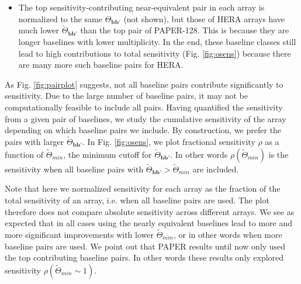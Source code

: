 \documentclass[twocolumn,apj,numberedappendix]{emulateapj}
\renewcommand\[{\begin{equation}}
\renewcommand\]{\end{equation}}
\begin{document}
\begin{itemize}
\item The top sensitivity-contributing near-equivalent pair in each array is normalized to the same $\Theta_{\boldsymbol{bb'}}$ (not shown), but those of HERA arrays have much lower $\widetilde{\Theta}_{\boldsymbol{bb'}}$ than the top pair of PAPER-128. This is because they are longer baselines with lower multiplicity. In the end, these baseline classes still lead to high contributions to total sensitivity (Fig. \ref{fig:osens}) because there are many more such baseline pairs for HERA.  

\end{itemize}

As Fig. \ref{fig:pairplot} suggests, not all baseline pairs contribute significantly to sensitivity. Due to the large number of baseline pairs, it may not be computationally feasible to include all pairs. Having quantified the sensitivity from a given pair of baselines, we study the cumulative sensitivity of the array depending on which baseline pairs we include. By construction, we prefer the pairs with larger $\widetilde{\Theta}_{\boldsymbol{bb'}}$. In Fig. \ref{fig:osens}, we plot fractional sensitivity $\rho$ as a function of $\widetilde{\Theta}_{min}$, the minimum cutoff for $\widetilde{\Theta}_{\boldsymbol{bb'}}$. In other words $\rho(\widetilde{\Theta}_{min})$ is the sensitivity when all baseline pairs with $\widetilde{\Theta}_{\boldsymbol{bb'}}>\widetilde{\Theta}_{min}$ are included. 

Note that here we normalized sensitivity for each array as the fraction of the total sensitivity of an array, i.e. when all baseline pairs are used. The plot therefore does not compare absolute sensitivity across different arrays. We see as expected that in all cases using the nearly equivalent baselines lead to more and more significant improvements with lower $\widetilde{\Theta}_{min}$, or in other words when more baseline pairs are used. We point out that PAPER results until now \citep{Ali2015, paper32} only used the top contributing baseline pairs. In other words these results only explored sensitivity $\rho(\widetilde{\Theta}_{min}\sim 1)$. 
\end{document}

